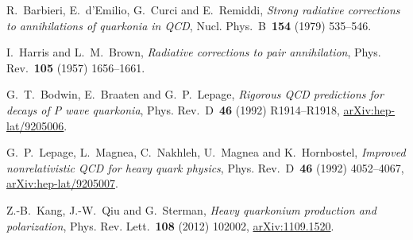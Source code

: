 R.~Barbieri, E.~d'Emilio, G.~Curci and E.~Remiddi, \emph{Strong radiative corrections to annihilations of quarkonia in QCD}, Nucl. Phys.~B~\textbf{154} (1979) \mbox{535--546}.

I.~Harris and L.~M.~Brown, \emph{Radiative corrections to pair annihilation}, Phys. Rev.~\textbf{105} (1957) \mbox{1656--1661}.

G.~T.~Bodwin, E.~Braaten and G.~P.~Lepage, \emph{Rigorous QCD predictions for decays of P wave quarkonia}, Phys. Rev.~D~\textbf{46} (1992) \mbox{R1914--R1918}, \href{https://arxiv.org/abs/hep-lat/9205006}{arXiv:hep-lat/9205006}.

G.~P.~Lepage, L.~Magnea, C.~Nakhleh, U.~Magnea and K.~Hornbostel, \emph{Improved nonrelativistic QCD for heavy quark physics}, Phys. Rev.~D~\textbf{46} (1992) \mbox{4052--4067}, \href{https://arxiv.org/abs/hep-lat/9205007}{arXiv:hep-lat/9205007}.

Z.-B.~Kang, J.-W.~Qiu and G.~Sterman, \emph{Heavy quarkonium production and polarization}, Phys. Rev. Lett.~\textbf{108} (2012) \mbox{102002}, \href{https://arxiv.org/abs/1109.1520}{arXiv:1109.1520}.
